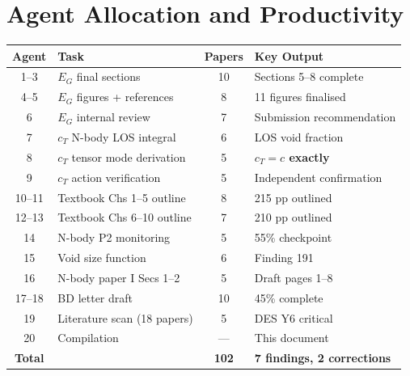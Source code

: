 \documentclass[11pt,a4paper]{article}
\begin{document}
\section{Agent Allocation and Productivity}

\begin{center}
\begin{tabular}{clcl}
\toprule
\textbf{Agent} & \textbf{Task} & \textbf{Papers} & \textbf{Key Output} \\
\midrule
1--3 & $E_G$ final sections & 10 & Sections 5--8 complete \\
4--5 & $E_G$ figures + references & 8 & 11 figures finalised \\
6 & $E_G$ internal review & 7 & Submission recommendation \\
7 & $c_T$ N-body LOS integral & 6 & LOS void fraction \\
8 & $c_T$ tensor mode derivation & 5 & \textbf{$c_T = c$ exactly} \\
9 & $c_T$ action verification & 5 & Independent confirmation \\
10--11 & Textbook Chs 1--5 outline & 8 & 215 pp outlined \\
12--13 & Textbook Chs 6--10 outline & 7 & 210 pp outlined \\
14 & N-body P2 monitoring & 5 & 55\% checkpoint \\
15 & Void size function & 6 & Finding 191 \\
16 & N-body paper I Secs 1--2 & 5 & Draft pages 1--8 \\
17--18 & BD letter draft & 10 & 45\% complete \\
19 & Literature scan (18 papers) & 5 & DES Y6 critical \\
20 & Compilation & --- & This document \\
\midrule
\textbf{Total} & & \textbf{102} & \textbf{7 findings, 2 corrections} \\
\bottomrule
\end{tabular}
\end{center}
\end{document}
